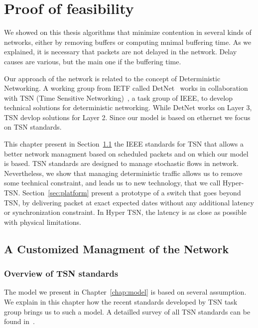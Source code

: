 
\chapter{Proof of feasibility}
\label{chap:TSN}
\minitoc

We showed on this thesis algorithms that minimize contention in several kinds of networks, either by removing buffers or computing mnimal buffering time. As we explained, it is necessary that packets are not delayed in the network. Delay causes are various, but the main one if the buffering time. 


Our approach of the network is related to the concept of Deterministic Networking. A working group from IETF called DetNet~\cite{finn-detnet-architecture-08} works in collaboration with TSN (Time Sensitive Networking)~\cite{ieee802}, a task group of IEEE, to develop technical solutions for deterministic networking. While DetNet works on Layer 3, TSN devlop solutions for Layer 2. Since our model is based on ethernet we focus on TSN standards.

This chapter present in Section~\ref{sec:TSNqbv} the IEEE standards for TSN that allows a better network managment based on scheduled packets and on which our model is based. TSN standards are designed to manage stochastic flows in network. Nevertheless, we show that managing deterministic traffic allows us to remove some technical constraint, and leads us to new technology, that we call Hyper-TSN. Section~\ref{sec:platform} present a prototype of a switch that goes beyond TSN, by delivering packet at exact expected dates without any additional latency or synchronization constraint. In Hyper TSN, the latency is as close as possible with physical limitations.


\section{A Customized Managment of the Network}
\label{sec:TSNqbv}

\subsection{Overview of TSN standards}
The model we present in Chapter~\ref{chap:model} is based on several assumption. We explain in this chapter how the recent standards developed by TSN task group brings us to such a model. A detailled survey of all TSN standards can be found in~\cite{8458130}. 


